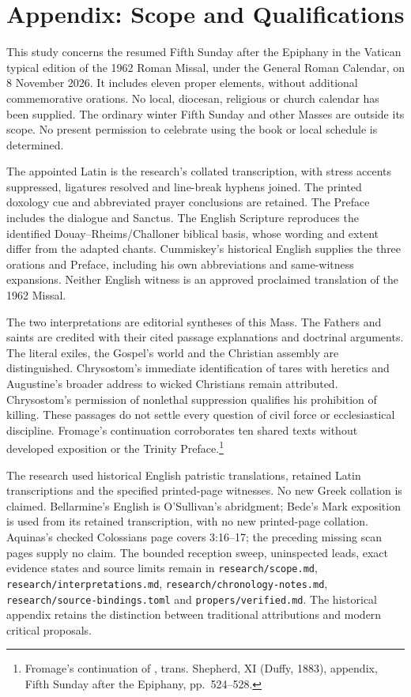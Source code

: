 \section{Appendix: Scope and Qualifications}
This study concerns the resumed Fifth Sunday after the Epiphany in the
Vatican typical edition of the 1962 Roman Missal, under the General Roman
Calendar, on 8 November 2026. It includes eleven proper elements, without
additional commemorative orations. No local, diocesan, religious or church
calendar has been supplied. The ordinary winter Fifth Sunday and other
Masses are outside its scope. No present permission to celebrate using
the book or local schedule is determined.

The appointed Latin is the research's collated transcription, with stress
accents suppressed, ligatures resolved and line-break hyphens joined.
The printed doxology cue and abbreviated prayer conclusions are retained.
The Preface includes the dialogue and Sanctus. The English Scripture
reproduces the identified Douay--Rheims/Challoner biblical basis, whose
wording and extent differ from the adapted chants. Cummiskey's historical
English supplies the three orations and Preface, including his own
abbreviations and same-witness expansions. Neither English witness is an
approved proclaimed translation of the 1962 Missal.

The two interpretations are editorial syntheses of this Mass. The Fathers
and saints are credited with their cited passage explanations and doctrinal
arguments. The literal exiles, the Gospel's world and the Christian
assembly are distinguished. Chrysostom's immediate identification of tares
with heretics and Augustine's broader address to wicked Christians remain
attributed. Chrysostom's permission of nonlethal suppression qualifies his
prohibition of killing. These passages do not settle every question of
civil force or ecclesiastical discipline. Fromage's continuation corroborates
ten shared texts without developed exposition or the Trinity Preface.\footnote{Fromage's continuation of , trans. Shepherd, XI (Duffy, 1883), appendix, Fifth Sunday after the Epiphany, pp.~524--528.}

The research used historical English patristic translations, retained
Latin transcriptions and the specified printed-page witnesses. No new
Greek collation is claimed. Bellarmine's English is O'Sullivan's abridgment;
Bede's Mark exposition is used from its retained transcription, with no
new printed-page collation. Aquinas's checked Colossians page covers
3:16--17; the preceding missing scan pages supply no claim. The bounded
reception sweep, uninspected leads, exact evidence states and source limits
remain in \texttt{research/scope.md}, \texttt{research/interpretations.md},
\texttt{research/chronology-notes.md}, \texttt{research/source-bindings.toml}
and \texttt{propers/verified.md}. The historical appendix retains the
distinction between traditional attributions and modern critical proposals.

